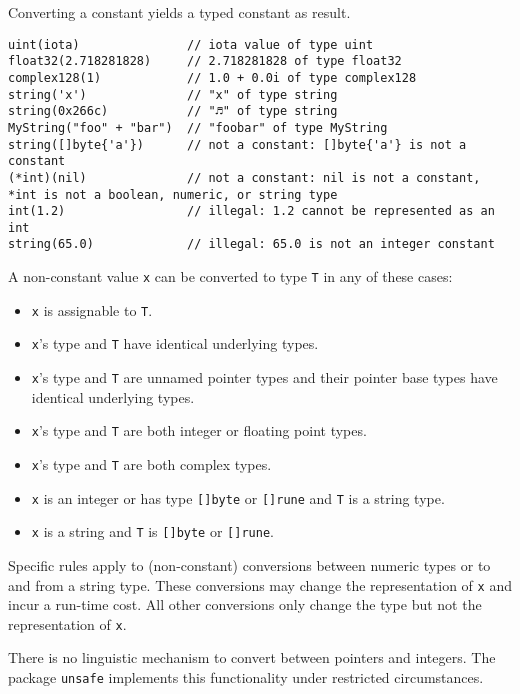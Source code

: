 Converting a constant yields a typed constant as result.

\begin{Verbatim}[frame=single]
uint(iota)               // iota value of type uint
float32(2.718281828)     // 2.718281828 of type float32
complex128(1)            // 1.0 + 0.0i of type complex128
string('x')              // "x" of type string
string(0x266c)           // "♬" of type string
MyString("foo" + "bar")  // "foobar" of type MyString
string([]byte{'a'})      // not a constant: []byte{'a'} is not a constant
(*int)(nil)              // not a constant: nil is not a constant, *int is not a boolean, numeric, or string type
int(1.2)                 // illegal: 1.2 cannot be represented as an int
string(65.0)             // illegal: 65.0 is not an integer constant
\end{Verbatim}

A non-constant value \texttt{x} can be converted to type \texttt{T} in
any of these cases:

\begin{itemize}
\item
  \texttt{x} is assignable to \texttt{T}.
\item
  \texttt{x}'s type and \texttt{T} have identical
  underlying types.
\item
  \texttt{x}'s type and \texttt{T} are unnamed pointer types and their
  pointer base types have identical underlying types.
\item
  \texttt{x}'s type and \texttt{T} are both integer or floating point
  types.
\item
  \texttt{x}'s type and \texttt{T} are both complex types.
\item
  \texttt{x} is an integer or has type \texttt{{[}{]}byte} or
  \texttt{{[}{]}rune} and \texttt{T} is a string type.
\item
  \texttt{x} is a string and \texttt{T} is \texttt{{[}{]}byte} or
  \texttt{{[}{]}rune}.
\end{itemize}

Specific rules apply to (non-constant) conversions between numeric types
or to and from a string type. These conversions may change the
representation of \texttt{x} and incur a run-time cost. All other
conversions only change the type but not the representation of
\texttt{x}.

There is no linguistic mechanism to convert between pointers and
integers. The package \texttt{unsafe}
implements this functionality under restricted circumstances.

